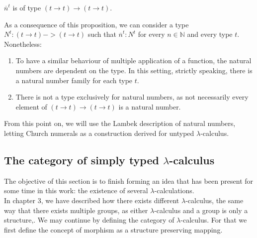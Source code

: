 \begin{remark}
  $\overline n^t$ is of type $(t\to t)\to(t\to t)$.
\end{remark}

As a consequence of this proposition, we can consider a type $N^t: (t \to t) -> (t \to t)$ such that $\overline n^t:N^t$ for every $n\in\mathbb{N}$ and every type $t$. Nonetheless:
\begin{enumerate}

\item To have a similar behaviour of multiple application of a function, the natural numbers are dependent on the type. In this setting, strictly speaking, there is a natural number family for each type $t$.
\item There is not a type exclusively for natural numbers, as not necessarily every element of $(t\to t)\to(t\to t)$ is a natural number.
\end{enumerate}
From this point on, we will use the Lambek description of natural numbers, letting Church numerals as a construction derived for untyped $\lambda$-calculus.\\


\subsection{The category of simply typed $\lambda$-calculus}

The objective of this section is to finish forming an idea that has been present for some time in this work: the existence of several $\lambda$-calculations. \\

In chapter 3, we have described how there exists different $\lambda$-calculus, the same way that there exists multiple groups, as either $\lambda$-calculus and a group is only a structure,. We may continue by defining the category of $\lambda$-calculus. For that we first define the concept of morphism as a structure preserving mapping.



